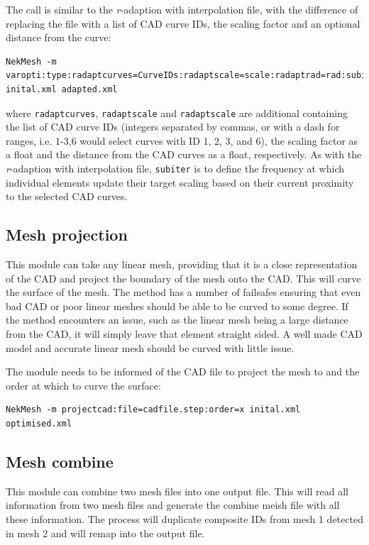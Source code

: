 The call is similar to the \emph{r}-adaption with interpolation file, with the difference of replacing the file with a list of CAD curve IDs, the scaling factor and an optional distance from the curve:
\begin{lstlisting}[style=BashInputStyle]
  NekMesh -m varopti:type:radaptcurves=CurveIDs:radaptscale=scale:radaptrad=rad:subiter=x inital.xml adapted.xml
\end{lstlisting}
where \texttt{radaptcurves}, \texttt{radaptscale} and \texttt{radaptscale} are
additional containing the list of CAD curve IDs (integers separated by commas,
or with a dash for ranges, i.e. 1-3,6 would select curves with ID 1, 2, 3, and
6), the scaling factor as a float and the distance from the CAD curves as a
float, respectively. As with the \emph{r}-adaption with interpolation file,
\texttt{subiter} is to define the frequency at which individual elements update
their target scaling based on their current proximity to the selected CAD
curves.

\subsection{Mesh projection}
This module can take any linear mesh, providing that it is a close
representation of the CAD and project the boundary of the mesh onto the CAD.
This will curve the surface of the mesh. The method has a number of failsafes
ensuring that even bad CAD or poor linear meshes should be able to be curved to
some degree. If the method encounters an issue, such as the linear mesh being a
large distance from the CAD, it will simply leave that element straight sided. A
well made CAD model and accurate linear mesh should be curved with little issue.

The module needs to be informed of the CAD file to project the mesh to and the
order at which to curve the surface:
\begin{lstlisting}[style=BashInputStyle]
  NekMesh -m projectcad:file=cadfile.step:order=x inital.xml optimised.xml
\end{lstlisting}

\subsection{Mesh combine}
This module can combine two mesh files into one output file.
This will read all information from two mesh files and generate the combine meish 
file with all these information. The process will duplicate composite IDs 
from mesh 1 detected in mesh 2 and will remap into the output file.


